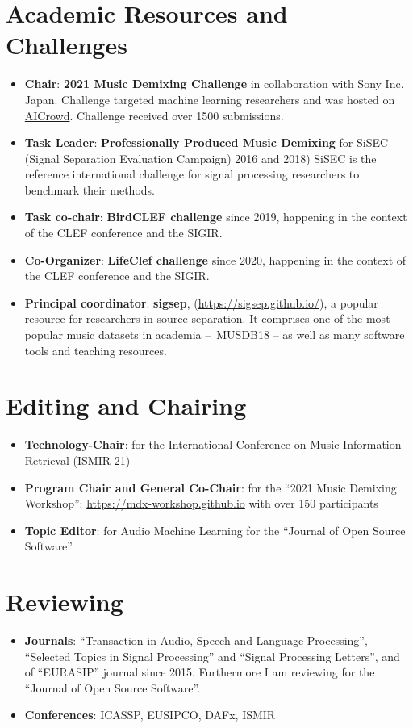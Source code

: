 \documentclass[a4paper,11pt]{article}
\newcommand{\resumeItem}[2]{
  \item\small{
    \textbf{#1}{: #2 \vspace{-2pt}}
  }
}
\newcommand{\resumeSubItem}[2]{\resumeItem{#1}{#2}\vspace{-4pt}}
\newcommand{\resumeSubHeadingListStart}{\begin{itemize}[leftmargin=*]}
\newcommand{\resumeSubHeadingListEnd}{\end{itemize}}
\begin{document}
\section{Academic Resources and Challenges}
  \resumeSubHeadingListStart
  \resumeSubItem{Chair}{\textbf{2021 Music Demixing Challenge} in collaboration with Sony Inc. Japan. Challenge targeted machine learning researchers and was hosted on \href{https://www.aicrowd.com/challenges/music-demixing-challenge-ismir-2021}{AICrowd}. Challenge received over 1500 submissions.}
  \resumeSubItem{Task Leader}{\textbf{Professionally Produced Music Demixing} for SiSEC (Signal Separation Evaluation Campaign) 2016 and 2018)
  SiSEC is the reference international challenge for signal processing researchers to benchmark their methods.}
  \resumeSubItem{Task co-chair}{\textbf{BirdCLEF challenge} since 2019, happening in the context of the CLEF conference and the SIGIR.}
  \resumeSubItem{Co-Organizer}{\textbf{LifeClef challenge} since 2020, happening in the context of the CLEF conference and the SIGIR.}
  \resumeSubItem{Principal coordinator}{\textbf{sigsep}, (\url{https://sigsep.github.io/}), a popular resource for researchers in source separation.
  It comprises one of the most popular music datasets in academia – \textsc{MUSDB18} – as well as many software tools and teaching resources.}
  \resumeSubHeadingListEnd

\section{Editing and Chairing}
\resumeSubHeadingListStart  
  \resumeSubItem{Technology-Chair}{for the International Conference on Music Information Retrieval (ISMIR 21)}
  \resumeSubItem{Program Chair and General Co-Chair}{for the ``2021 Music Demixing Workshop'': \url{https://mdx-workshop.github.io} with over 150 participants}
  \resumeSubItem{Topic Editor}{for Audio Machine Learning for the  ``Journal of Open Source Software''}
\resumeSubHeadingListEnd

\section{Reviewing}
\resumeSubHeadingListStart
  \resumeSubItem{Journals}{``Transaction in Audio, Speech and Language Processing'', ``Selected Topics in Signal Processing'' and ``Signal Processing Letters'', and of ``EURASIP'' journal since 2015. Furthermore I am reviewing for the ``Journal of Open Source Software''.}
  \resumeSubItem{Conferences}{ICASSP, EUSIPCO, DAFx, ISMIR}
\resumeSubHeadingListEnd
\end{document}

